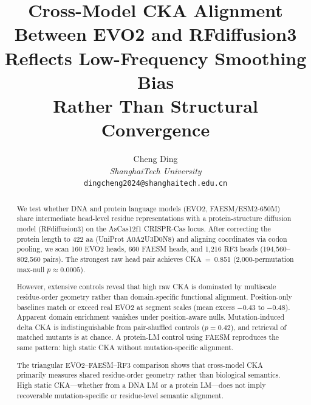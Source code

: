 \documentclass[11pt]{article}
\title{Cross-Model CKA Alignment Between EVO2 and RFdiffusion3\\
Reflects Low-Frequency Smoothing Bias\\
Rather Than Structural Convergence}
\author{Cheng Ding\\
\textit{ShanghaiTech University}\\
\texttt{dingcheng2024@shanghaitech.edu.cn}}
\date{}
\begin{document}
\maketitle

\begin{abstract}
We test whether DNA and protein language models (EVO2, FAESM/ESM2-650M)
share intermediate head-level residue representations with a
protein-structure diffusion model (RFdiffusion3) on the AsCas12f1
CRISPR-Cas locus. After correcting the protein length to 422 aa
(UniProt A0A2U3D0N8) and aligning coordinates via codon pooling,
we scan 160 EVO2 heads, 660 FAESM heads, and 1,216 RF3 heads
(194,560--802,560 pairs). The strongest raw head pair achieves
CKA~=~0.851 (2,000-permutation max-null $p \approx 0.0005$).

However, extensive controls reveal that high raw CKA is dominated by
multiscale residue-order geometry rather than domain-specific functional
alignment. Position-only baselines match or exceed real EVO2 at segment
scales (mean excess $-$0.43 to $-$0.48). Apparent domain enrichment
vanishes under position-aware nulls. Mutation-induced delta CKA is
indistinguishable from pair-shuffled controls ($p = 0.42$), and
retrieval of matched mutants is at chance. A protein-LM control
using FAESM reproduces the same pattern: high static CKA without
mutation-specific alignment.

The triangular EVO2--FAESM--RF3 comparison shows that cross-model CKA
primarily measures shared residue-order geometry rather than biological
semantics. High static CKA---whether from a DNA LM or a protein LM---does
not imply recoverable mutation-specific or residue-level semantic alignment.
\end{abstract}
\end{document}
